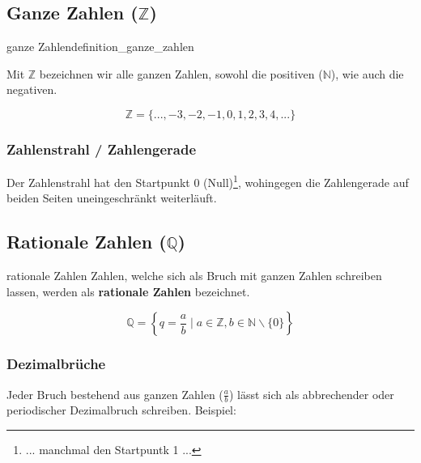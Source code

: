 \subsection{Ganze Zahlen ($\mathbb{Z}$)}
\begin{definition}{ganze Zahlen}{definition_ganze_zahlen}

  Mit $\mathbb{Z}$ bezeichnen wir alle ganzen Zahlen, sowohl die
  positiven ($\mathbb{N}$), wie auch die negativen.
  \end{definition}

$$\mathbb{Z} = \{..., -3, -2, -1, 0, 1, 2, 3,  4, ... \}$$

\subsubsection{Zahlenstrahl / Zahlengerade}

\begin{center}
\end{center}

Der Zahlenstrahl hat den Startpunkt 0 (Null)\footnote{... manchmal  den Startpuntk 1 ...}, wohingegen die
Zahlengerade auf beiden Seiten uneingeschränkt weiterläuft.

\subsection{Rationale Zahlen ($\mathbb{Q}$)}

\begin{definition}{rationale Zahlen}{}
Zahlen, welche sich als Bruch mit ganzen Zahlen schreiben lassen,
werden als \textbf{rationale Zahlen} bezeichnet.


$$\mathbb{Q} =\left\{ q = \frac{a}{b} \mid a \in \mathbb{Z}, b \in \mathbb{N}\backslash\{0\}\right\}$$
\end{definition}

\subsubsection{Dezimalbrüche}
Jeder Bruch bestehend aus ganzen Zahlen ($\frac{a}{b}$) lässt sich als
abbrechender oder periodischer Dezimalbruch schreiben. Beispiel:

